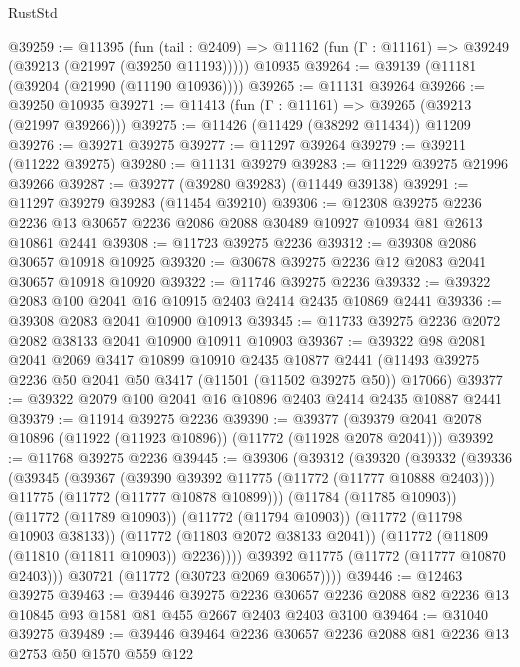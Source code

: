 \begin{lexlean}{RustStd}
\begin{coremodule}
@39259 := @11395
    (fun (tail : @2409) => @11162 (fun (Γ : @11161) => @39249 (@39213 (@21997 (@39250 @11193)))))
    @10935
@39264 := @39139 (@11181 (@39204 (@21990 (@11190 @10936))))
@39265 := @11131 @39264
@39266 := @39250 @10935
@39271 := @11413 (fun (Γ : @11161) => @39265 (@39213 (@21997 @39266)))
@39275 := @11426 (@11429 (@38292 @11434)) @11209
@39276 := @39271 @39275
@39277 := @11297 @39264
@39279 := @39211 (@11222 @39275)
@39280 := @11131 @39279
@39283 := @11229 @39275 @21996 @39266
@39287 := @39277 (@39280 @39283) (@11449 @39138)
@39291 := @11297 @39279 @39283 (@11454 @39210)
@39306 := @12308
    @39275
    @2236
    @2236
    @13
    @30657
    @2236
    @2086
    @2088
    @30489
    @10927
    @10934
    @81
    @2613
    @10861
    @2441
@39308 := @11723 @39275 @2236
@39312 := @39308 @2086 @30657 @10918 @10925
@39320 := @30678 @39275 @2236 @12 @2083 @2041 @30657 @10918 @10920
@39322 := @11746 @39275 @2236
@39332 := @39322 @2083 @100 @2041 @16 @10915 @2403 @2414 @2435 @10869 @2441
@39336 := @39308 @2083 @2041 @10900 @10913
@39345 := @11733 @39275 @2236 @2072 @2082 @38133 @2041 @10900 @10911 @10903
@39367 := @39322
    @98
    @2081
    @2041
    @2069
    @3417
    @10899
    @10910
    @2435
    @10877
    @2441
    (@11493 @39275 @2236 @50 @2041 @50 @3417 (@11501 (@11502 @39275 @50)) @17066)
@39377 := @39322 @2079 @100 @2041 @16 @10896 @2403 @2414 @2435 @10887 @2441
@39379 := @11914 @39275 @2236
@39390 := @39377 (@39379 @2041 @2078 @10896 (@11922 (@11923 @10896)) (@11772 (@11928 @2078 @2041)))
@39392 := @11768 @39275 @2236
@39445 := @39306
    (@39312
      (@39320
        (@39332
          (@39336
            (@39345
              (@39367
                (@39390 @39392 @11775 (@11772 (@11777 @10888 @2403)))
                @11775
                (@11772 (@11777 @10878 @10899)))
              (@11784 (@11785 @10903))
              (@11772 (@11789 @10903))
              (@11772 (@11794 @10903))
              (@11772 (@11798 @10903 @38133))
              (@11772 (@11803 @2072 @38133 @2041))
              (@11772 (@11809 (@11810 (@11811 @10903)) @2236))))
          @39392
          @11775
          (@11772 (@11777 @10870 @2403)))
        @30721
        (@11772 (@30723 @2069 @30657))))
@39446 := @12463 @39275
@39463 := @39446
    @39275
    @2236
    @30657
    @2236
    @2088
    @82
    @2236
    @13
    @10845
    @93
    @1581
    @81
    @455
    @2667
    @2403
    @2403
    @3100
@39464 := @31040 @39275
@39489 := @39446
    @39464
    @2236
    @30657
    @2236
    @2088
    @81
    @2236
    @13
    @2753
    @50
    @1570
    @559
    @122

\end{coremodule}
\end{lexlean}
